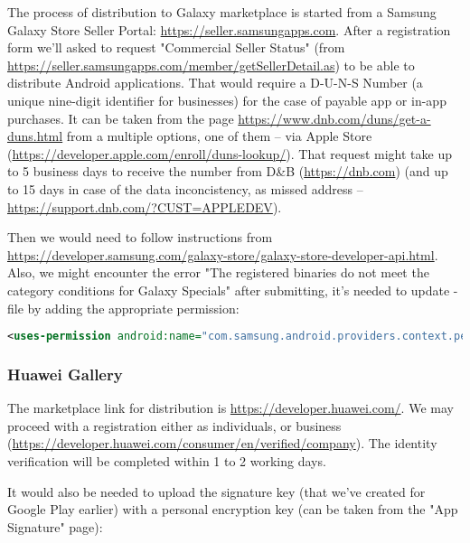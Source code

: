 The process of distribution to Galaxy marketplace is started from a Samsung Galaxy Store Seller Portal:
\href{https://seller.samsungapps.com}{https://seller.samsungapps.com}.
After a registration form we'll asked to request "Commercial Seller Status" (from 
\href{https://seller.samsungapps.com/member/getSellerDetail.as}{https://seller.samsungapps.com/member/getSellerDetail.as})
to be able to distribute Android applications. That would require a D-U-N-S Number (a unique nine-digit identifier for 
businesses) for the case of payable app or in-app purchases. It can be taken from the page 
\href{https://www.dnb.com/duns/get-a-duns.html}{ https://www.dnb.com/duns/get-a-duns.html}
from a multiple options, one of them -- via Apple Store 
(\href{https://developer.apple.com/enroll/duns-lookup/}{https://developer.apple.com/enroll/duns-lookup/}).
That request might take up to 5 business days to receive the number from D\&B (\href{https://dnb.com}{https://dnb.com})
(and up to 15 days in case of the data inconcistency, as missed address -- 
\href{https://support.dnb.com/?CUST=APPLEDEV}{https://support.dnb.com/?CUST=APPLEDEV}). 

Then we would need to follow instructions  from 
\href{https://developer.samsung.com/galaxy-store/galaxy-store-developer-api.html}{https://developer.samsung.com/galaxy-store/galaxy-store-developer-api.html}.
Also, we might encounter the error "The registered binaries do not meet the category conditions for Galaxy Specials" 
after submitting, it's needed to update -file by adding the appropriate permission:

\begin{lstlisting}[language=xml]
<uses-permission android:name="com.samsung.android.providers.context.permission.WRITE_USE_APP_FEATURE_SURVEY"/>
\end{lstlisting}

\subsubsection{Huawei Gallery}

The marketplace link for distribution is \href{https://developer.huawei.com/}{https://developer.huawei.com/}.
We may proceed with a registration either as individuals, or business 
(\href{https://developer.huawei.com/consumer/en/verified/company}{https://developer.huawei.com/consumer/en/verified/company}).
The identity verification will be completed within 1 to 2 working days.

It would also be needed to upload the signature key (that we've created for Google Play earlier) with a 
personal encryption key (can be taken from the "App Signature" page):


